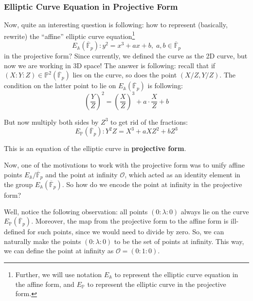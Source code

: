 \documentclass[../lecture-notes-148x210.tex]{subfiles}
\begin{document}
\subsubsection{Elliptic Curve Equation in Projective Form}

Now, quite an interesting question is following: how to represent (basically, rewrite) the ``affine'' elliptic curve equation\footnote{Further, we will use notation $E_{\mathbb{A}}$ to represent the elliptic curve equation in the affine form, and $E_{\mathbb{P}}$ to represent the elliptic curve in the projective form.}
\begin{equation*}
    E_{\mathbb{A}}(\overline{\mathbb{F}}_p): y^2 = x^3 + ax + b, \; a,b \in \overline{\mathbb{F}}_p
\end{equation*}
in the projective form? Since currently, we defined the curve as the 2D curve, but now we are working in 3D space! The answer is following: recall that if $(X:Y:Z) \in \mathbb{P}^2(\overline{\mathbb{F}}_p)$ lies on the curve, so does the point $(X/Z,Y/Z)$. The condition on the latter point to lie on $E_{\mathbb{A}}(\overline{\mathbb{F}}_p)$ is following:
\begin{equation*}
    \left(\frac{Y}{Z}\right)^2 = \left(\frac{X}{Z}\right)^3 + a\cdot \frac{X}{Z} + b
\end{equation*}

But now multiply both sides by $Z^3$ to get rid of the fractions:
\begin{equation*}
    E_{\mathbb{P}}(\overline{\mathbb{F}}_p): Y^2Z = X^3 + aXZ^2 + bZ^3
\end{equation*}

This is an equation of the elliptic curve in \textbf{projective form}. 

Now, one of the motivations to work with the projective form was to unify affine points $E_{\mathbb{A}}/\overline{\mathbb{F}}_p$ and the point at infinity $\mathcal{O}$, which acted as an identity element in the group $E_{\mathbb{A}}(\overline{\mathbb{F}}_p)$. So how do we encode the point at infinity in the projective form?

Well, notice the following observation: all points $(0:\lambda:0)$ always lie on the curve $E_{\mathbb{P}}(\overline{\mathbb{F}}_p)$. Moreover, the map from the projective form to the affine form is ill-defined for such points, since we would need to divide by zero. So, we can naturally make the points $(0:\lambda:0)$ to be the set of points at infinity. This way, we can define the point at infinity as $\mathcal{O} = (0:1:0)$.
\end{document}
